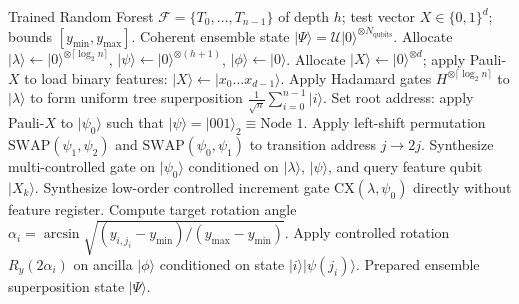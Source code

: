 \documentclass[sn-mathphys,Numbered]{sn-jnl}
\theoremstyle{thmstyleone}
\theoremstyle{thmstyletwo}
\theoremstyle{thmstylethree}
\begin{document}
\begin{algorithm}[ht]
\caption{Dual-Tier Coherent Forest Traversal and State Encoding}\label{alg1}
\begin{algorithmic}[1]
\Require Trained Random Forest $\mathcal{F} = \{T_0, \dots, T_{n-1}\}$ of depth $h$; test vector $X \in \{0, 1\}^d$; bounds $[y_{\min}, y_{\max}]$.
\Ensure Coherent ensemble state $|\Psi\rangle = \mathcal{U}|0\rangle^{\otimes N_{\mathrm{qubits}}}$.
\State Allocate $|\lambda\rangle \leftarrow |0\rangle^{\otimes \lceil\log_2 n\rceil}$, $|\psi\rangle \leftarrow |0\rangle^{\otimes (h+1)}$, $|\phi\rangle \leftarrow |0\rangle$.
    \State Allocate $|X\rangle \leftarrow |0\rangle^{\otimes d}$; apply Pauli-$X$ to load binary features: $|X\rangle \leftarrow |x_0 \dots x_{d-1}\rangle$.
\EndIf
\State Apply Hadamard gates $H^{\otimes \lceil\log_2 n\rceil}$ to $|\lambda\rangle$ to form uniform tree superposition $\frac{1}{\sqrt{n}}\sum_{i=0}^{n-1}|i\rangle$.
\State Set root address: apply Pauli-$X$ to $|\psi_0\rangle$ such that $|\psi\rangle = |001\rangle_2 \equiv \text{Node } 1$.
 
    \State Apply left-shift permutation $\text{SWAP}(\psi_1, \psi_2)$ and $\text{SWAP}(\psi_0, \psi_1)$ to transition address $j \to 2j$.
        \State Synthesize multi-controlled gate on $|\psi_0\rangle$ conditioned on $|\lambda\rangle$, $|\psi\rangle$, and query feature qubit $|X_{k}\rangle$.
    \Else {}
         \State Synthesize low-order controlled increment gate $\text{CX}(\lambda, \psi_0)$ directly without feature register.
        \EndIf
    \EndIf
\EndFor
{} 
    \State Compute target rotation angle $\alpha_i = \arcsin\sqrt{(y_{i, j_i} - y_{\min}) / (y_{\max} - y_{\min})}$.
    \State Apply controlled rotation $R_y(2\alpha_i)$ on ancilla $|\phi\rangle$ conditioned on state $|i\rangle|\psi(j_i)\rangle$.
\EndFor
\State \Return Prepared ensemble superposition state $|\Psi\rangle$.
\end{algorithmic}
\end{algorithm}
\end{document}
